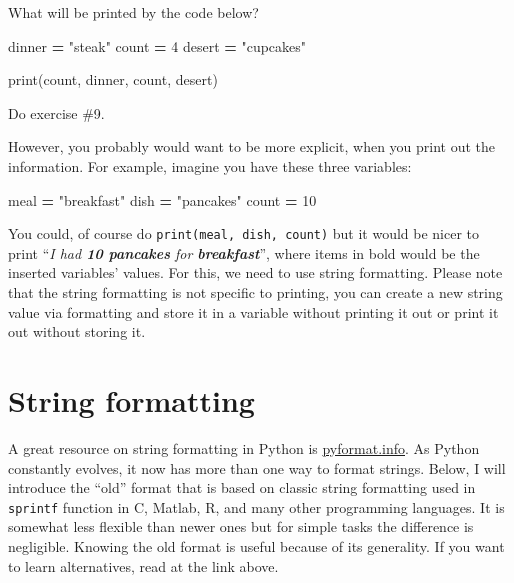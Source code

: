 \documentclass[
]{book}
\newenvironment{Shaded}{\begin{snugshade}}{\end{snugshade}}
\newcommand{\BuiltInTok}[1]{#1}
\newcommand{\DecValTok}[1]{\textcolor[rgb]{0.00,0.00,0.81}{#1}}
\newcommand{\NormalTok}[1]{#1}
\newcommand{\OperatorTok}[1]{\textcolor[rgb]{0.81,0.36,0.00}{\textbf{#1}}}
\newcommand{\StringTok}[1]{\textcolor[rgb]{0.31,0.60,0.02}{#1}}
\begin{document}
What will be printed by the code below?

\begin{Shaded}
\begin{Highlighting}[]
\NormalTok{dinner }\OperatorTok{=} \StringTok{"steak"}
\NormalTok{count }\OperatorTok{=} \DecValTok{4}
\NormalTok{desert }\OperatorTok{=} \StringTok{"cupcakes"}

\BuiltInTok{print}\NormalTok{(count, dinner, count, desert)}
\end{Highlighting}
\end{Shaded}

Do exercise \#9.

However, you probably would want to be more explicit, when you print out the information. For example, imagine you have these three variables:

\begin{Shaded}
\begin{Highlighting}[]
\NormalTok{meal }\OperatorTok{=} \StringTok{"breakfast"}
\NormalTok{dish }\OperatorTok{=} \StringTok{"pancakes"}
\NormalTok{count }\OperatorTok{=} \DecValTok{10}
\end{Highlighting}
\end{Shaded}

You could, of course do \texttt{print(meal,\ dish,\ count)} but it would be nicer to print ``\emph{I had \textbf{10 pancakes} for \textbf{breakfast}}'', where items in bold would be the inserted variables' values. For this, we need to use string formatting. Please note that the string formatting is not specific to printing, you can create a new string value via formatting and store it in a variable without printing it out or print it out without storing it.

\hypertarget{string-formatting}{%
\section{String formatting}\label{string-formatting}}

A great resource on string formatting in Python is \href{https://pyformat.info/}{pyformat.info}. As Python constantly evolves, it now has more than one way to format strings. Below, I will introduce the ``old'' format that is based on classic string formatting used in \texttt{sprintf} function in C, Matlab, R, and many other programming languages. It is somewhat less flexible than newer ones but for simple tasks the difference is negligible. Knowing the old format is useful because of its generality. If you want to learn alternatives, read at the link above.
\end{document}
